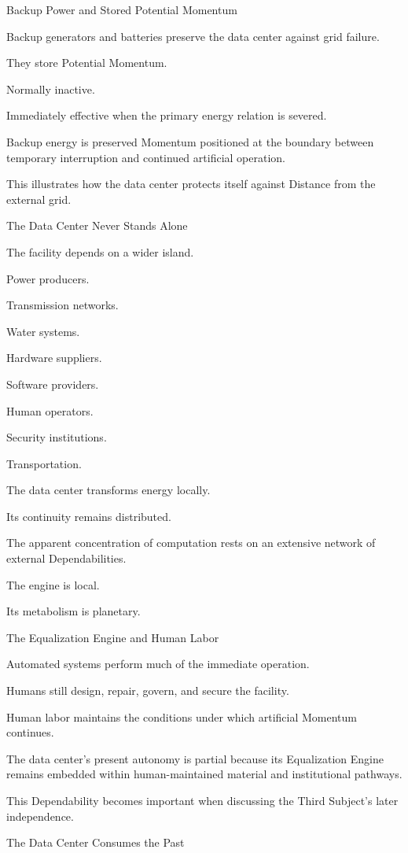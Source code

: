 Backup Power and Stored Potential Momentum

Backup generators and batteries preserve the data center against grid failure.

They store Potential Momentum.

Normally inactive.

Immediately effective when the primary energy relation is severed.

Backup energy is preserved Momentum positioned at the boundary between temporary interruption and continued artificial operation.

This illustrates how the data center protects itself against Distance from the external grid.

The Data Center Never Stands Alone

The facility depends on a wider island.

Power producers.

Transmission networks.

Water systems.

Hardware suppliers.

Software providers.

Human operators.

Security institutions.

Transportation.

The data center transforms energy locally.

Its continuity remains distributed.

The apparent concentration of computation rests on an extensive network of external Dependabilities.

The engine is local.

Its metabolism is planetary.

The Equalization Engine and Human Labor

Automated systems perform much of the immediate operation.

Humans still design, repair, govern, and secure the facility.

Human labor maintains the conditions under which artificial Momentum continues.

The data center’s present autonomy is partial because its Equalization Engine remains embedded within human-maintained material and institutional pathways.

This Dependability becomes important when discussing the Third Subject’s later independence.

The Data Center Consumes the Past


